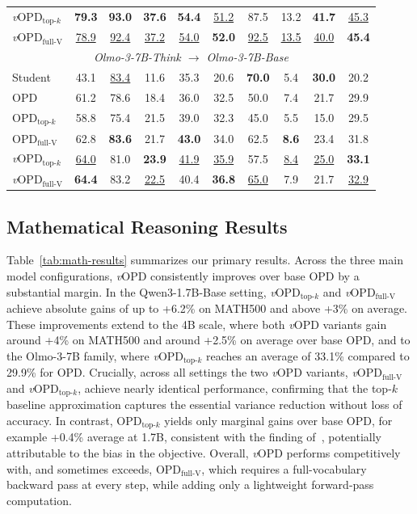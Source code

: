 \documentclass{article}
\newcommand{\method}{\emph{v}OPD}
\begin{document}
\begin{table}[!t]
{\begin{tabular}{l|cc|cc|cc|cc|c}
\rowcolor{blue!10}
\method{}$_{\text{top-}k}$ & \textbf{79.3} & \textbf{93.0} & \textbf{37.6} & \textbf{54.4} & \underline{51.2} & 87.5 & 13.2 & \textbf{41.7} & \underline{45.3} \\
\rowcolor{blue!10}
\method{}$_{\text{full-V}}$ & \underline{78.9} & \underline{92.4} & \underline{37.2} & \underline{54.0} & \textbf{52.0} & \underline{92.5} & \underline{13.5} & \underline{40.0} & \textbf{45.4} \\
\midrule
\multicolumn{10}{c}{\textit{Olmo-3-7B-Think $\rightarrow$ Olmo-3-7B-Base}} \\
\midrule
Student & 43.1 & \underline{83.4} & 11.6 & 35.3 & 20.6 & \textbf{70.0} & 5.4 & \textbf{30.0} & 20.2 \\
OPD & 61.2 & 78.6 & 18.4 & 36.0 & 32.5 & 50.0 & 7.4 & 21.7 & 29.9 \\
OPD$_{\text{top-}k}$ & 58.8 & 75.4 & 21.5 & 39.0 & 32.3 & 45.0 & 5.5 & 15.0 & 29.5 \\
OPD$_{\text{full-V}}$ & 62.8 & \textbf{83.6} & 21.7 & \textbf{43.0} & 34.0 & 62.5 & \textbf{8.6} & 23.4 & 31.8 \\
\rowcolor{blue!10}
\method{}$_{\text{top-}k}$ & \underline{64.0} & 81.0 & \textbf{23.9} & \underline{41.9} & \underline{35.9} & 57.5 & \underline{8.4} & \underline{25.0} & \textbf{33.1} \\
\rowcolor{blue!10}
\method{}$_{\text{full-V}}$ & \textbf{64.4} & 83.2 & \underline{22.5} & 40.4 & \textbf{36.8} & \underline{65.0} & 7.9 & 21.7 & \underline{32.9} \\
\bottomrule
\end{tabular}%
}
\end{table}

\subsection{Mathematical Reasoning Results}
\label{sec:exp-math}
Table~\ref{tab:math-results} summarizes our primary results. Across the three main model configurations, \method{} consistently improves over base OPD by a substantial margin. In the Qwen3-1.7B-Base setting, \method{}$_\text{top-$k$}$ and \method{}$_\text{full-V}$ achieve absolute gains of up to +6.2\% on MATH500 and above +3\% on average. These improvements extend to the 4B scale, where both \method{} variants gain around +4\% on MATH500 and around +2.5\% on average over base OPD, and to the Olmo-3-7B family, where \method{}$_\text{top-$k$}$ reaches an average of 33.1\% compared to 29.9\% for OPD. Crucially, across all settings the two \method{} variants, \method{}$_\text{full-V}$ and \method{}$_\text{top-$k$}$, achieve nearly identical performance, confirming that the top-$k$ baseline approximation captures the essential variance reduction without loss of accuracy. In contrast, $\text{OPD}_\text{top-$k$}$ yields only marginal gains over base OPD, for example +0.4\% average at 1.7B, consistent with the finding of~\citet{li2026rethinkingopd}, potentially attributable to the bias in the objective. Overall, \method{} performs competitively with, and sometimes exceeds, $\text{OPD}_\text{full-V}$, which requires a full-vocabulary backward pass at every step, while adding only a lightweight forward-pass computation.
\end{document}
